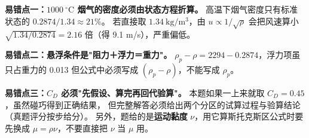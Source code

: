 \begin{yicuo}
\textbf{易错点一：$1000\ ^{\circ}\mathrm{C}$ 烟气的密度必须由状态方程折算。}
高温下烟气密度只有标准状态的 $0.2874/1.34\approx21\%$。
若直接取 $1.34\ \mathrm{kg/m^3}$，由 $u\propto1/\sqrt{\rho}$ 会把风速算小
$\sqrt{1.34/0.2874}=2.16$ 倍（得 9.1 m/s），严重偏低。

\textbf{易错点二：悬浮条件是"阻力＋浮力＝重力"。}
$\rho_p-\rho=2294-0.2874$，浮力项虽只占重力的 0.013%
但公式中必须写成 $(\rho_p-\rho)$，不能写成 $\rho_p$。

\textbf{易错点三：$C_D$ 必须"先假设、算完再回代验算"。}
本题如果一上来就取 $C_D=0.45$，虽然碰巧得到正确结果，
但完整解答必须给出两个分区的试算过程与验算结论（真题评分按步给分）。
另外，题给的是\textbf{运动黏度} $\nu$，用它算斯托克斯区公式时要先换成
$\mu=\rho\nu$，不要直接把 $\nu$ 当 $\mu$ 用。
\end{yicuo}

